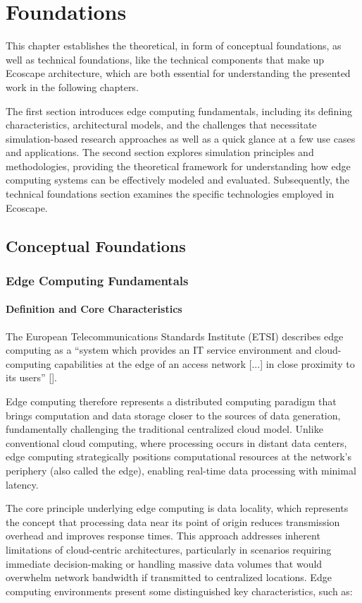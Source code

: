\chapter{Foundations}
This chapter establishes the theoretical, in form of conceptual foundations, as well as technical foundations, like the technical components that make up Ecoscape architecture, 
which are both essential for understanding the presented work in the following chapters.

The first section introduces edge computing fundamentals, including its defining characteristics, architectural models, and the challenges that necessitate simulation-based research approaches as well as a quick glance at a few use cases and applications.
The second section explores simulation principles and methodologies, providing the theoretical framework for understanding how edge computing systems can be effectively modeled and evaluated.
Subsequently, the technical foundations section examines the specific technologies employed in Ecoscape.
\section{Conceptual Foundations}
\subsection{Edge Computing Fundamentals}
\subsubsection{Definition and Core Characteristics}
The European Telecommunications Standards Institute (ETSI) describes edge computing as a ``system which provides an IT service environment and cloud-computing capabilities at the edge of an access network [...] in close proximity to its users'' [\cite{etsi_mec}].

Edge computing therefore represents a distributed computing paradigm that brings computation and data storage closer to the sources of data generation, fundamentally challenging the traditional centralized cloud model.
Unlike conventional cloud computing, where processing occurs in distant data centers, edge computing strategically positions computational resources at the network's periphery (also called the edge), enabling real-time data processing with minimal latency.

The core principle underlying edge computing is data locality, which represents the concept that processing data near its point of origin reduces transmission overhead and improves response times.
This approach addresses inherent limitations of cloud-centric architectures, particularly in scenarios requiring immediate decision-making or handling massive data volumes that would overwhelm network bandwidth if transmitted to centralized locations.
Edge computing environments present some distinguished key characteristics, such as:


